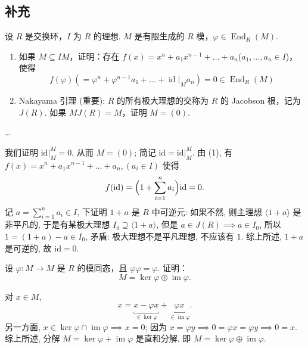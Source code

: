 \subsection{补充}

\setcounter{pb}{3}
\begin{problem}
    设 $ R $ 是交换环，$ I $ 为 $ R $ 的理想. $ M $ 是有限生成的 $ R $ 模，$ \varphi \in \operatorname{End}_R(M) $. 
    \begin{enumerate}[label=(\arabic*)]
        \item 如果 $ M \subseteq IM $，证明：存在 $ f(x) = x^n + a_1 x^{n-1} + \dots + a_n $($ a_1, \dots, a_n \in I $)，使得
              \[
                  f(\varphi) (= \varphi^n + \varphi^{n-1} a_1 + \dots + \operatorname{id} |_M a_n) = 0 \in \operatorname{End}_R(M)
              \]
        \item Nakayama 引理 (重要): $ R $ 的所有极大理想的交称为 $ R $ 的 Jacobson 根，记为 $ J(R) $. 如果 $ M J(R) = M $，证明 $ M = (0) $. 
    \end{enumerate}
\end{problem}

\begin{solution}
    \dots
    \par 我们证明 $\left.{\mathrm{id}}\right|_{M}^{M}=0$, 从而 $M=(0)$; 简记 $\mathrm{id}=\left.{\mathrm{id}}\right|_{M}^{M}$. 由 (1), 有 $f(x) = x^n + a_1 x^{n-1} + \dots + a_n,(a_{i}\in I)$ 使得  
        \[
            f(\mathrm{id})=\Bigl(1+\sum_{i=1}^{n}a_{i}\Bigr)\mathrm{id}=0.
        \]
    记 $a=\sum_{i=1}^{n}a_{i}\in I$, 下证明 $1+a$ 是 $R$ 中可逆元: 如果不然, 则主理想 $ \langle 1+a \rangle  $ 是非平凡的, 
    于是有某极大理想 $I_{0}\supseteq \langle 1+a \rangle$, 但是 $a\in J(R)\implies a\in I_{0}$, 所以 $1=(1+a)-a\in I_{0}$, 
    矛盾: 极大理想不是平凡理想, 不应该有 $1$. 综上所述, $1+a$ 是可逆的, 故 $\mathrm{id}=0$.
\end{solution}

\setcounter{pb}{6}
\begin{problem}
    设 $ \varphi: M \to M $ 是 $ R $ 的模同态，且 $ \varphi \varphi = \varphi $. 
    证明：
    \[
        M = \ker \varphi \oplus \operatorname{im} \varphi.
    \]
\end{problem}

\begin{solution}
    对 $x\in M$, 
        \[
            x=\underbracket{x-\varphi x}_{\in\ker \varphi}+\underbracket{\varphi x}_{\in \operatorname{im}\varphi}.
        \]
    另一方面, $x\in\ker\varphi\cap \operatorname{im}\varphi\implies x=0$; 因为 $x=\varphi y\implies 0=\varphi x=\varphi y\implies 0=x$. 
    综上所述, 分解 $M=\ker\varphi+\operatorname{im}\varphi$ 是直和分解, 即 $M=\ker\varphi\oplus\operatorname{im}\varphi$. 
\end{solution}
    

